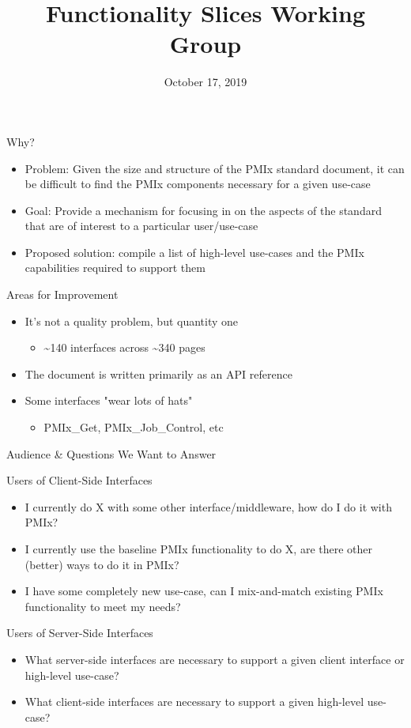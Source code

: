 \documentclass[presentation]{beamer}
\date{October 17, 2019}
\title{Functionality Slices Working Group}
\begin{document}
\maketitle

\begin{frame}[label={sec:org09a55ee}]{Why?}
\begin{itemize}
\item \alert{Problem:} Given the size and structure of the PMIx standard document, it can be difficult to find the PMIx components necessary for a given use-case
\item \alert{Goal:} Provide a mechanism for focusing in on the aspects of the standard that are of interest to a particular user/use-case
\item \alert{Proposed solution:} compile a list of high-level use-cases and the PMIx capabilities required to support them
\end{itemize}
\end{frame}
\begin{frame}[label={sec:org6b17e15}]{Areas for Improvement}
\begin{itemize}
\item It’s not a quality problem, but quantity one
\begin{itemize}
\item \textasciitilde{}140 interfaces across \textasciitilde{}340 pages
\end{itemize}
\item The document is written primarily as an API reference
\item Some interfaces "wear lots of hats"
\begin{itemize}
\item PMIx\_Get, PMIx\_Job\_Control, etc
\end{itemize}
\end{itemize}
\end{frame}
\begin{frame}[label={sec:orga50bf20}]{Audience \& Questions We Want to Answer}
\begin{block}{Users of Client-Side Interfaces}
\begin{itemize}
\item I currently do X with some other interface/middleware, how do I do it with PMIx?
\item I currently use the baseline PMIx functionality to do X, are there other (better) ways to do it in PMIx?
\item I have some completely new use-case, can I mix-and-match existing PMIx functionality to meet my needs?
\end{itemize}
\end{block}
\begin{block}{Users of Server-Side Interfaces}
\begin{itemize}
\item What server-side interfaces are necessary to support a given client interface or high-level use-case?
\item What client-side interfaces are necessary to support a given high-level use-case?
\end{itemize}
\end{block}
\end{frame}
\end{document}
